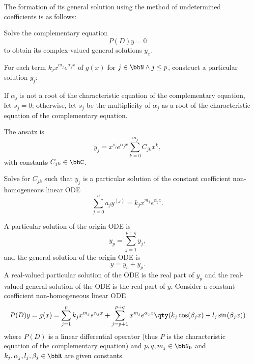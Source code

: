 \documentclass[a4paper,12pt]{report}
\begin{document}
The formation of its general solution using the method of undetermined coefficients is as follows:
\ben
\item Solve the complementary equation
\[P(D)y=0\]
to obtain its complex-valued general solutions $y_c$.
\item For each term $k_jx^{m_j}e^{\alpha_jx}$ of $g(x)$ for $j\in\bbN\land j\leq p$, construct a particular solution $y_j$:
\ben
\item If $\alpha_j$ is not a root of the characteristic equation of the complementary equation, let $s_j=0$; otherwise, let $s_j$ be the multiplicity of $\alpha_j$ as a root of the characteristic equation of the complementary equation.
\item The ansatz is
\[y_j=x^{s_j}e^{\alpha_jx}\sum_{k=0}^{m_j}C_{jk}x^k,\]
with constants $C_{jk}\in\bbC$.
\item Solve for $C_{jk}$ such that $y_j$ is a particular solution of the constant coefficient non-homogeneous linear ODE
\[\sum_{j=0}^na_jy^{(j)}=k_jx^{m_j}e^{\alpha_jx}.\]
\een
\item A particular solution of the origin ODE is
\[y_p=\sum_{j=1}^{p+q}y_j,\]
and the general solution of the origin ODE is
\[y=y_c+y_p.\]
A real-valued particular solution of the ODE is the real part of $y_p$ and the real-valued general solution of the ODE is the real part of $y$.
\een
{}
Consider a constant coefficient non-homogeneous linear ODE
\[P(D)y=g(x)=\sum_{j=1}^pk_jx^{m_j}e^{\alpha_jx}+\sum_{j=p+1}^{p+q}x^{m_j}e^{\alpha_jx}\qty(k_j\cos(\beta_jx)+l_j\sin(\beta_jx))\]
where $P(D)$ is a linear differential operator (thus $P$ is the characteristic equation of the complementary equation) and $p,q,m_j\in\bbN_0$ and $k_j,\alpha_j,l_j,\beta_j\in\bbR$ are given constants.
\end{document}
